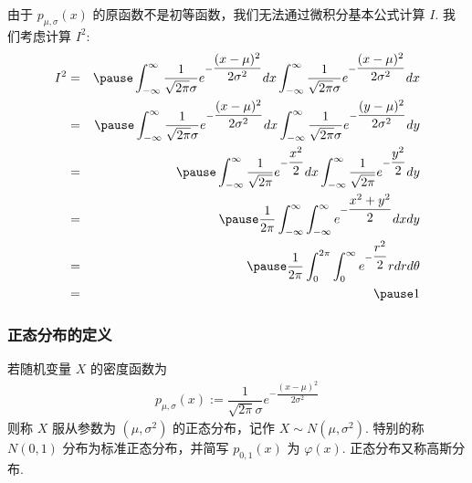 \documentclass[Prob-All.tex]{subfiles}
\begin{document}
\begin{frame}
	\vspace{0.4cm}
	由于 $p_{\mu,\sigma}(x)$ 的原函数不是初等函数，我们无法通过微积分基本公式计算 $I$. 我们考虑计算 $I^2$:
	\begin{eqnarray*}
		I^2&=&\pause \int_{-\infty}^\infty \dfrac{1}{\sqrt{2\pi}\sigma}e^{-\dfrac{(x-\mu)^2}{2\sigma^2}}dx\int_{-\infty}^\infty \dfrac{1}{\sqrt{2\pi}\sigma}e^{-\dfrac{(x-\mu)^2}{2\sigma^2}}dx\\
		&=&\pause \int_{-\infty}^\infty \dfrac{1}{\sqrt{2\pi}\sigma}e^{-\dfrac{(x-\mu)^2}{2\sigma^2}}dx\int_{-\infty}^\infty \dfrac{1}{\sqrt{2\pi}\sigma}e^{-\dfrac{(y-\mu)^2}{2\sigma^2}}dy\\
		&=&\pause \int_{-\infty}^\infty\dfrac{1}{\sqrt{2\pi}}e^{-\dfrac{x^2}{2}}dx\int_{-\infty}^\infty\dfrac{1}{\sqrt{2\pi}}e^{-\dfrac{y^2}{2}}dy\\
		&=&\pause \dfrac{1}{2\pi}\int_{-\infty}^\infty\int_{-\infty}^\infty e^{-\dfrac{x^2+y^2}{2}}dxdy\\
		&=&\pause \dfrac{1}{2\pi}\int_0^{2\pi}\int_0^\infty e^{-\dfrac{r^2}{2}}rdrd\theta\\
		&=&\pause 1
	\end{eqnarray*}


\end{frame}
\begin{frame}
	\frametitle{正态分布的定义}
	\begin{defi}
		若随机变量 $X$ 的密度函数为
		\begin{eqnarray*}
			p_{\mu,\sigma}(x):=\dfrac{1}{\sqrt{2\pi}\sigma}e^{-\dfrac{(x-\mu)^2}{2\sigma^2}}
		\end{eqnarray*}
		则称 $X$ 服从参数为 $(\mu,\sigma^2)$ 的正态分布，记作 $X\sim N (\mu,\sigma^2)$. 特别的称 $N (0,1)$ 分布为标准正态分布，并简写 $p_{0,1}(x)$ 为 $\varphi (x)$. 正态分布又称高斯分布.
	\end{defi}
\end{frame}
\end{document}
